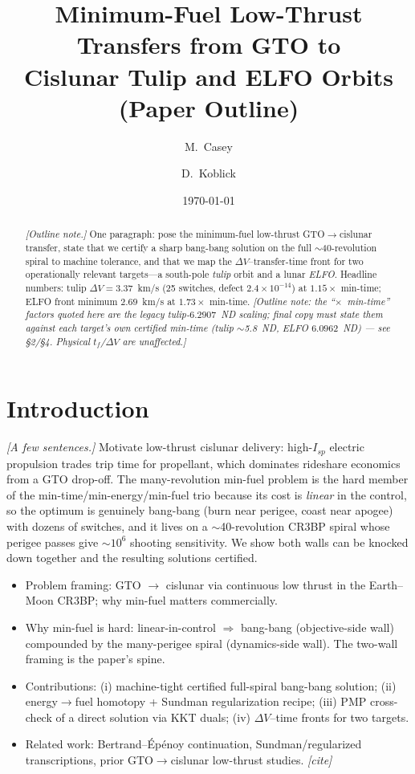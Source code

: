 \documentclass[11pt]{article}
\title{Minimum-Fuel Low-Thrust Transfers from GTO to\\
       Cislunar Tulip and ELFO Orbits\\[4pt]
       \large (Paper Outline)}
\author{M.\ Casey \and D.\ Koblick}
\date{\today}
\begin{document}
\maketitle

\begin{abstract}
\emph{[Outline note.]} One paragraph: pose the minimum-fuel low-thrust
GTO$\rightarrow$cislunar transfer, state that we certify a sharp bang-bang
solution on the full $\sim$40-revolution spiral to machine tolerance, and that
we map the $\Delta V$--transfer-time front for two operationally relevant
targets---a south-pole \emph{tulip} orbit and a lunar \emph{ELFO}. Headline
numbers: tulip $\Delta V = 3.37$~km/s (25 switches, defect $2.4\times10^{-14}$)
at $1.15\times$ min-time; ELFO front minimum $2.69$~km/s at $1.73\times$
min-time. \emph{[Outline note: the ``$\times$~min-time'' factors quoted here are
the legacy tulip-$6.2907$~ND scaling; final copy must state them against each
target's own certified min-time (tulip $\sim$5.8~ND, ELFO $6.0962$~ND) --- see
\S2/\S4. Physical $t_f$/$\Delta V$ are unaffected.]}
\end{abstract}

\section{Introduction}
\emph{[A few sentences.]} Motivate low-thrust cislunar delivery: high-$I_{sp}$
electric propulsion trades trip time for propellant, which dominates rideshare
economics from a GTO drop-off. The many-revolution min-fuel problem is the hard
member of the min-time/min-energy/min-fuel trio because its cost is \emph{linear}
in the control, so the optimum is genuinely bang-bang (burn near perigee, coast
near apogee) with dozens of switches, and it lives on a $\sim$40-revolution
CR3BP spiral whose perigee passes give $\sim10^6$ shooting sensitivity. We show
both walls can be knocked down together and the resulting solutions certified.

\begin{itemize}
  \item Problem framing: GTO $\rightarrow$ cislunar via continuous low thrust in
        the Earth--Moon CR3BP; why min-fuel matters commercially.
  \item Why min-fuel is hard: linear-in-control $\Rightarrow$ bang-bang
        (objective-side wall) compounded by the many-perigee spiral
        (dynamics-side wall). The two-wall framing is the paper's spine.
  \item Contributions: (i) machine-tight certified full-spiral bang-bang
        solution; (ii) energy$\rightarrow$fuel homotopy + Sundman regularization
        recipe; (iii) PMP cross-check of a direct solution via KKT duals;
        (iv) $\Delta V$--time fronts for two targets.
  \item Related work: Bertrand--\'Ep\'enoy continuation, Sundman/regularized
        transcriptions, prior GTO$\rightarrow$cislunar low-thrust studies.
        \emph{[cite]}
\end{itemize}
\end{document}
